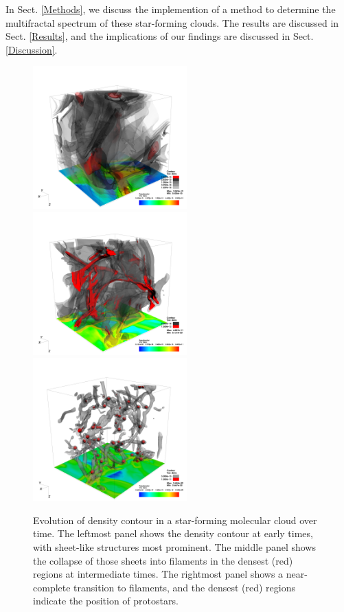 \documentclass{emulateapj}
\begin{document}
In Sect. \ref{Methods}, we discuss the implemention of a method to determine the multifractal spectrum of these star-forming clouds. The results are discussed in Sect. \ref{Results}, and the implications of our findings are discussed in Sect. \ref{Discussion}.

\begin{figure}[ht]
	\begin{center}
	\includegraphics[height=5.5cm,clip=true]{Graphics/bbb_0375_dens_contour_00500000.png}%
	\includegraphics[height=5.5cm,clip=true]{Graphics/bbb_0375_dens_contour_0200_0002.png}%
	\includegraphics[height=5.5cm,clip=true]{Graphics/bbb_0375_dens_contour0000.png}
	\end{center}
	\caption{Evolution of density contour in a star-forming molecular cloud over time. The leftmost panel shows the density contour at early times, with sheet-like structures most prominent. The middle panel shows the collapse of those sheets into filaments in the densest (red) regions at intermediate times. The rightmost panel shows a near-complete transition to filaments, and the densest (red) regions indicate the position of protostars.}
	\label{f:cloudevolution}
	\end{figure}
\end{document}
